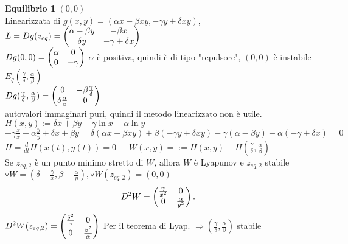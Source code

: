 \documentclass{article}
\begin{document}
 \textbf{Equilibrio 1} $(0,0)$\\
 Linearizzata di $g(x,y) = (\alpha x - \beta x y, -\gamma y + \delta x y )$,  \\$L = Dg(z_{eq}) = \begin{pmatrix}\alpha - \beta y & -\beta x\\ \delta y & -\gamma + \delta x\end{pmatrix}$\\
 $Dg(0,0) = \begin{pmatrix}\alpha & 0 \\ 0 & -\gamma\end{pmatrix}$  $\alpha$ è positiva, quindi è di tipo "repulsore", $(0,0)$ è instabile\\
 $E_q(\frac\gamma\delta,\frac\alpha\beta)$ \\
$Dg(\frac\gamma\delta, \frac\alpha\beta) = \begin{pmatrix}0 & -\beta\frac\gamma\delta\\\delta\frac\alpha\beta & 0\end{pmatrix}$\\
autovalori immaginari puri, quindi il metodo linearizzato non è utile.\\
  $H(x,y) := \delta x + \beta y-\gamma\ln x-\alpha \ln y $ \\
  $-\gamma\frac{x}{\dot x} -\alpha\frac{y}{\dot y} + \delta\dot x + \beta \dot y  = \delta (\alpha x - \beta xy) + \beta(-\gamma y + \delta xy) - \gamma(\alpha - \beta y)-\alpha(-\gamma + \delta x ) = 0$\\
  $\dot H = \frac{d}{dt} H(x(t), y(t)) =0 $\ \ \  $W(x,y) = := H(x,y) - H(\frac \gamma\delta, \frac\alpha\beta)$\\
  Se  $z_{eq,2}$ è un punto minimo stretto di  $W$, allora $W$ è Lyapunov e $z_{eq,2} $ stabile \\
  $\triangledown W = (\delta - \frac \gamma x, \beta - \frac \alpha y), \triangledown W(z_{eq,2}) = (0,0)$ 
 \\
 \[
	 D^2 W = \begin{pmatrix}\frac\gamma {x^2} & 0 \\ 0 & \frac{\alpha}{y^2}\end{pmatrix}
 .\] 
 $D^2W(z_{eq,2}) = \begin{pmatrix}\frac{\delta^2}{\gamma} & 0 \\ 0 & \frac{\beta^2}\alpha\end{pmatrix}$ Per il teorema di Lyap.  $ \Rightarrow (\frac\gamma\delta, \frac\alpha\beta)$ stabile

\end{document}
